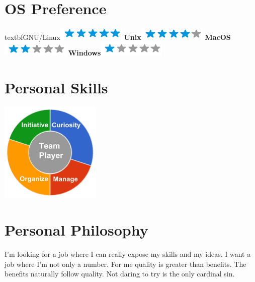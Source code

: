 \documentclass[]{friggeri-cv}
\begin{document}
\begin{aside}
  \section{OS Preference}
    textbf{GNU/Linux}\includegraphics[scale=0.40]{img/5stars.png}
    \textbf{Unix}\includegraphics[scale=0.40]{img/4stars.png}
    \textbf{MacOS}\includegraphics[scale=0.40]{img/2stars.png}
    \textbf{Windows}\includegraphics[scale=0.40]{img/1stars.png}
    ~
  \section{Personal Skills}
    \includegraphics[scale=0.62]{img/personal.png}
    ~
\end{aside}

\section{Personal Philosophy}
    I'm looking for a job where I can really expose my skills and my ideas. I want a job where I'm not only a number. 
    For me quality is greater than benefits.
    The benefits naturally follow quality.
    Not daring to try is the only cardinal sin.
\end{document}
